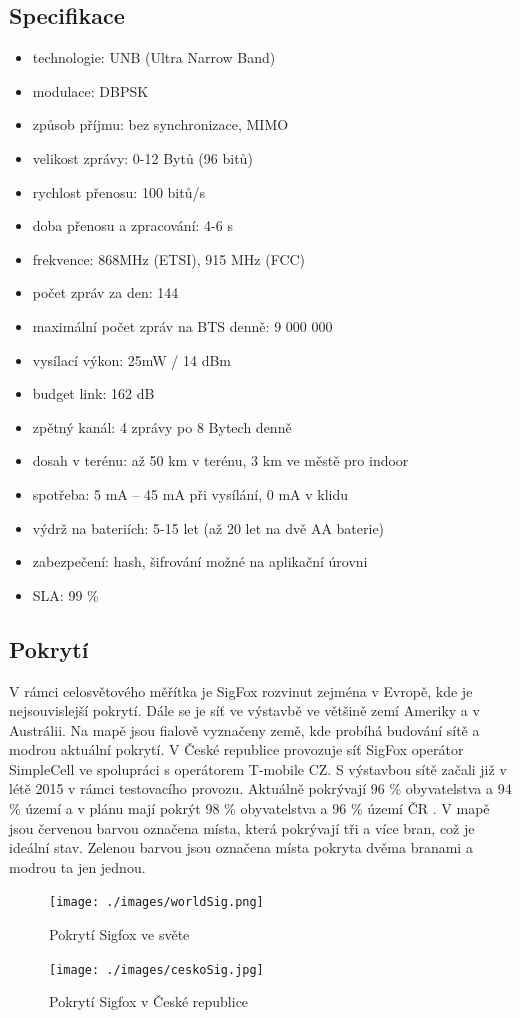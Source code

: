 \documentclass{ctuthesis}
\begin{document}
\subsection{Specifikace}
\begin{itemize}
\item technologie: UNB (Ultra Narrow Band)
\item modulace: DBPSK
\item způsob příjmu: bez synchronizace, MIMO
\item velikost zprávy: 0-12 Bytů (96 bitů)
\item rychlost přenosu: 100 bitů/s
\item doba přenosu a zpracování: 4-6 s
\item frekvence: 868MHz (ETSI), 915 MHz (FCC)
\item počet zpráv za den: 144
\item maximální počet zpráv na BTS denně: 9 000 000
\item vysílací výkon: 25mW / 14 dBm
\item budget link: 162 dB
\item zpětný kanál: 4 zprávy po 8 Bytech denně
\item dosah v terénu: až 50 km v terénu, 3 km ve městě pro indoor
\item spotřeba: 5 mA – 45 mA při vysílání, 0 mA v klidu 
\item výdrž na bateriích: 5-15 let (až 20 let na dvě AA baterie)
\item zabezpečení: hash, šifrování možné na aplikační úrovni
\item SLA: 99 \% \cite{iotportalSigfox}
\end{itemize}
\subsection{Pokrytí}
V rámci celosvětového měřítka je SigFox rozvinut zejména v Evropě, kde je nejsouvislejší pokrytí. Dále se je síť ve výstavbě ve většině zemí Ameriky a v Austrálii.
Na mapě jsou fialově vyznačeny země, kde probíhá budování sítě a modrou aktuální pokrytí.
V České republice provozuje síť SigFox operátor SimpleCell ve spolupráci s operátorem T-mobile CZ. S výstavbou sítě začali již v létě 2015 v rámci testovacího provozu. Aktuálně pokrývají 96 \% obyvatelstva a 94 \% území a v plánu mají pokrýt 98 \% obyvatelstva a 96 \% území ČR \cite{simplecell}. V mapě jsou červenou barvou označena místa, která pokrývají tři a více bran, což je ideální stav.  Zelenou barvou jsou označena místa pokryta dvěma branami a modrou ta jen jednou.
\begin{figure}
\caption{Pokrytí Sigfox ve světe\cite{wolrdsigfox}}
\texttt{[image: ./images/worldSig.png]}
\label{sigfoxSvet}
\end{figure}
\begin{figure}
\caption{Pokrytí Sigfox v České republice \cite{iotportal}}
\texttt{[image: ./images/ceskoSig.jpg]}
\label{sigfoxCR}
\end{figure}
\end{document}
